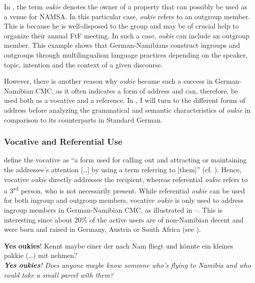 \documentclass[output=paper]{langsci/langscibook}
\begin{document}
In , the term \textit{oukie} denotes the owner of a property that can possibly be used as a venue for NAMSA. In this particular case, \textit{oukie} refers to an outgroup member. This is because he is well-disposed to the group and may be of crucial help to organize their annual FtF meeting. In such a case, \textit{oukie} can include an outgroup member. This example shows that German-Namibians construct ingroups and outgroups through multilingualism language practices depending on the speaker, topic, intention and the context of a given discourse. 

However, there is another reason why \textit{oukie} became such a success in German-Namibian CMC, as it often indicates a form of address and can, therefore, be used both as a vocative and a reference. In , I will turn to the different forms of address before analyzing the grammatical and semantic characteristics of \textit{oukie} in comparison to its counterparts in Standard German.

 
\subsubsection{Vocative and Referential Use} 
 \label{sec:radke:3.4.3}

\citet[626]{daniel_vocative_2008} define the vocative as “a form used for calling out and attracting or maintaining the addressee’s attention […] by using a term referring to [them]” (cf. \citealt[2]{sonnenhauser_vocative!:_2013}). Hence, vocative \textit{oukie} directly addresses the recipient, whereas referential \textit{oukie} refers to a 3\textsuperscript{rd} person, who is not necessarily present. While referential \textit{oukie} can be used for both ingroup and outgroup members, vocative \textit{oukie} is only used to address ingroup members in German-Namibian CMC, as illustrated in --. This is interesting since about 20\% of the active users are of non-Namibian decent and were born and raised in Germany, Austria or South Africa (see \citealt{radke_urban_inpress}).   

\ea 
 \label{ex:radke:15}
 \textbf{Yes} \textbf{oukies}! Kennt maybe einer der nach Nam fliegt und könnte ein kleines pakkie (…) mit nehmen?\\
 \textit{\textbf{Yes} \textbf{oukies}! Does anyone maybe know someone who’s flying to Namibia and who could take a small parcel with them?}\\
 \z
 
\end{document}
